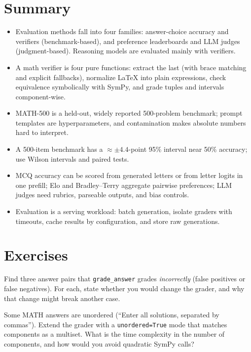 \section{Summary}
\begin{itemize}
  \item Evaluation methods fall into four families: answer-choice accuracy and verifiers
  (benchmark-based), and preference leaderboards and LLM judges (judgment-based). Reasoning
  models are evaluated mainly with verifiers.
  \item A math verifier is four pure functions: extract the last \bx{} (with brace matching and
  explicit fallbacks), normalize \LaTeX{} into plain expressions, check equivalence symbolically
  with SymPy, and grade tuples and intervals component-wise.
  \item MATH-500 is a held-out, widely reported 500-problem benchmark; prompt templates are
  hyperparameters, and contamination makes absolute numbers hard to interpret.
  \item A 500-item benchmark has a $\approx\pm4.4$-point 95\% interval near 50\% accuracy; use Wilson
  intervals and paired tests.
  \item MCQ accuracy can be scored from generated letters or from letter logits in one prefill;
  Elo and Bradley--Terry aggregate pairwise preferences; LLM judges need rubrics, parseable
  outputs, and bias controls.
  \item Evaluation is a serving workload: batch generation, isolate graders with timeouts, cache
  results by configuration, and store raw generations.
\end{itemize}

\section{Exercises}

\begin{exercise}
Find three answer pairs that \texttt{grade\_answer} grades \emph{incorrectly} (false positives or
false negatives). For each, state whether you would change the grader, and why that change might
break another case.
\end{exercise}

\begin{exercise}\label{ex:eval:sets}
Some MATH answers are unordered (``Enter all solutions, separated by commas''). Extend the grader
with a \texttt{unordered=True} mode that matches components as a multiset. What is the time
complexity in the number of components, and how would you avoid quadratic SymPy calls?
\end{exercise}

